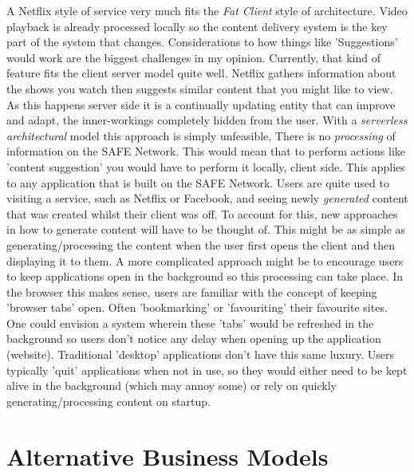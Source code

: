 \documentclass{l4proj}
\begin{document}
A Netflix style of service very much fits the \textit{Fat Client} style of architecture. Video playback is already processed locally so the content delivery system is the key part of the system that changes. Considerations to how things like 'Suggestions' would work are the biggest challenges in my opinion. Currently, that kind of feature fits the client server model quite well. Netflix gathers information about the shows you watch then suggests similar content that you might like to view. As this happens server side it is a continually updating entity that can improve and adapt, the inner-workings completely hidden from the user. With a \textit{serverless architectural} model this approach is simply unfeasible, There is no \textit{processing} of information on the SAFE Network. This would mean that to perform actions like 'content suggestion' you would have to perform it locally, client side. This applies to any application that is built on the SAFE Network. Users are quite used to visiting a service, such as Netflix or Facebook, and seeing newly \textit{generated} content that was created whilst their client was off. To account for this, new approaches in how to generate content will have to be thought of. This might be as simple as generating/processing the content when the user first opens the client and then displaying it to them. A more complicated approach might be to encourage users to keep applications open in the background so this processing can take place. In the browser this makes sense, users are familiar with the concept of keeping 'browser tabs' open. Often 'bookmarking' or 'favouriting' their favourite sites. One could envision a system wherein these 'tabs' would be refreshed in the background so users don't notice any delay when opening up the application (website). Traditional 'desktop' applications don't have this same luxury. Users typically 'quit' applications when not in use, so they would either need to be kept alive in the background (which may annoy some) or rely on quickly generating/processing content on startup.

\section{Alternative Business Models}
\end{document}
